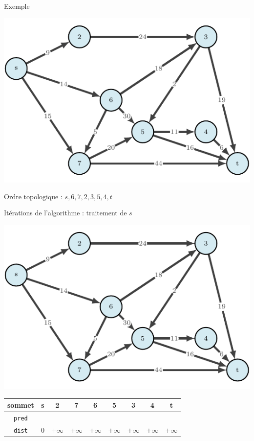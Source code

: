 \begin{frame}{Exemple}
    \begin{center}
        \includegraphics[height=.6\textheight]{fig/ordinal-0.pdf}

        Ordre topologique : $s,6,7,2,3,5,4,t$
    \end{center}
\end{frame}

\begin{frame}{Itérations de l'algorithme : traitement de $s$}
    \begin{center}
        \includegraphics[height=.6\textheight]{fig/ordinal-0.pdf}      
    \begin{tabular}{c|cccccccc}
        
        sommet & s       &2      &7      &6      &5      &3      &4      &t      \\
        \hline
        \texttt{pred} & &       &       &       &       &       &       &       \\
        \texttt{dist} & 0       &$+\infty$    &$+\infty$    &$+\infty$    &$+\infty$    &$+\infty$    &$+\infty$    &$+\infty$    \\
    \end{tabular}
\end{center}
\end{frame}

